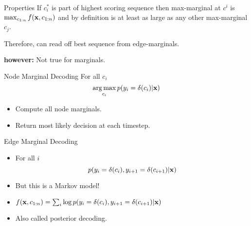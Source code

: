 \documentclass{beamer}
\begin{document}
\begin{frame}{Properties}
  If $c^*_i$ is part of highest scoring sequence then max-marginal at
  $c^i$ is $\max_{c_{1:n}} f(\mathbf{x}, c_{1:n})$ and by definition is at
  least as large as any other max-marginal $c_j$.

  Therefore, can read off best sequence from edge-marginals.

  \textbf{however:} Not true for marginals.
\end{frame}

\begin{frame}{Node Marginal Decoding}
  For all $c_i$ 
  \[ \argmax_{c_i} p(y_i = \delta(c_i) | \boldx)   \] 

  \begin{itemize}
  \item Compute all node marginals.
    \air 
  \item Return most likely decision at each timestep.
  \end{itemize}
\end{frame}


\begin{frame}{Edge Marginal Decoding}
  \begin{itemize}
  \item   For all $i$ 
    \[  p(y_i = \delta(c_i), y_{i+1} = \delta(c_{i+1}) | \mathbf{x})   \] 
  \item But this is a Markov model! 
    \air 

  \item $f(\mathbf{x}, c_{1:n}) = \sum_{i} \log p(y_i = \delta(c_i), y_{i+1} = \delta(c_{i+1}) | \mathbf{x}) $

  \end{itemize}

  \begin{itemize}
  \item Also called posterior decoding.
  \end{itemize}
\end{frame}
\end{document}
